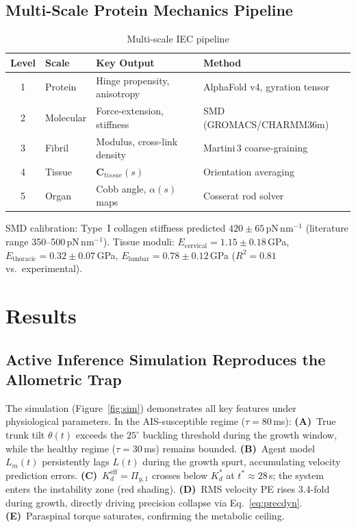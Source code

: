 \documentclass[12pt, letterpaper]{article}
\newcommand{\Kdcrit}{K_d^{*}}
\newcommand{\Kdeff}{K_d^{\mathrm{eff}}}
\newcommand{\Piy}{\Pi_{y,1}}
\newcommand{\Lm}{L_m}
\begin{document}
\subsection{Multi-Scale Protein Mechanics Pipeline}

\begin{table}[H]
  \centering
  \caption{Multi-scale IEC pipeline}
  \label{tab:pipeline}
  \renewcommand{\arraystretch}{1.3}
  \begin{tabular}{clll}
    \toprule
    Level & Scale & Key Output & Method \\
    \midrule
    1 & Protein & Hinge propensity, anisotropy & AlphaFold v4, gyration tensor \\
    2 & Molecular & Force-extension, stiffness & SMD (GROMACS/CHARMM36m) \\
    3 & Fibril & Modulus, cross-link density & Martini\,3 coarse-graining \\
    4 & Tissue & $\mathbf{C}_{tissue}(s)$ & Orientation averaging \\
    5 & Organ & Cobb angle, $\alpha(s)$ maps & Cosserat rod solver \\
    \bottomrule
  \end{tabular}
\end{table}

\noindent SMD calibration: Type~I collagen stiffness predicted
$420 \pm 65$\,pN\,nm$^{-1}$ (literature range 350--500\,pN\,nm$^{-1}$).
Tissue moduli: $E_{\mathrm{cervical}} = 1.15 \pm 0.18$\,GPa,
$E_{\mathrm{thoracic}} = 0.32 \pm 0.07$\,GPa,
$E_{\mathrm{lumbar}} = 0.78 \pm 0.12$\,GPa ($R^{2} = 0.81$ vs.\ experimental).

\section{Results}

\subsection{Active Inference Simulation Reproduces the Allometric Trap}

The simulation (Figure~\ref{fig:sim}) demonstrates all key features under
physiological parameters. In the AIS-susceptible regime ($\tau = 80$\,ms):
\textbf{(A)}~True trunk tilt $\theta(t)$ exceeds the $25^{\circ}$ buckling
threshold during the growth window, while the healthy regime ($\tau = 30$\,ms)
remains bounded. \textbf{(B)}~Agent model $\Lm(t)$ persistently lags $L(t)$
during the growth spurt, accumulating velocity prediction errors.
\textbf{(C)}~$\Kdeff = \Piy$ crosses below $\Kdcrit$ at $t^{*} \approx 28$\,s;
the system enters the instability zone (red shading).
\textbf{(D)}~RMS velocity PE rises 3.4-fold during growth, directly driving
precision collapse via Eq.~\eqref{eq:precdyn}.
\textbf{(E)}~Paraspinal torque saturates, confirming the metabolic ceiling.
\end{document}

